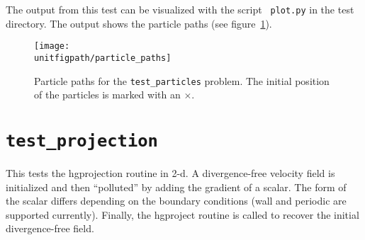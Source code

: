   The output from this test can be visualized with the script {\tt
  plot.py} in the test directory.  The output shows the particle
  paths (see figure~\ref{fig:unit:particles}).

\begin{figure}[t] 
\centering
\texttt{[image: \\unitfigpath/particle\_paths]} 
%
\caption[Particle paths for the {\tt test\_particles} problem]{\label{fig:unit:particles}
  Particle paths for the {\tt test\_particles} problem.  The initial
  position of the particles is marked with an $\times$.}
\end{figure}


\section {\tt test\_projection}

  This tests the hgprojection routine in 2-d.  A divergence-free
  velocity field is initialized and then ``polluted'' by adding the
  gradient of a scalar.  The form of the scalar differs depending on
  the boundary conditions (wall and periodic are supported currently).
  Finally, the hgproject routine is called to recover the initial
  divergence-free field.  




